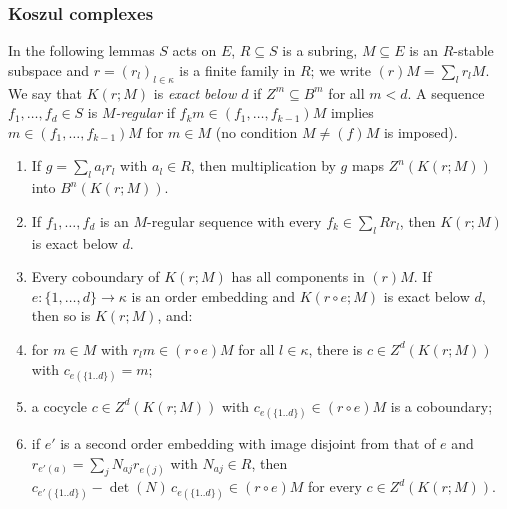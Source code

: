 \subsubsection*{Koszul complexes}
In the following lemmas $S$ acts on $E$, $R\subseteq S$ is a subring, $M\subseteq E$ is an $R$-stable subspace and $r=(r_l)_{l\in\kappa}$ is a
finite family in $R$; we write $(r)M=\sum_lr_lM$. We say that $K(r;M)$ is \emph{exact below $d$} if $Z^m\subseteq B^m$ for all $m<d$. A sequence
$f_1,\dots,f_d\in S$ is \emph{$M$-regular} if $f_km\in(f_1,\dots,f_{k-1})M$ implies $m\in(f_1,\dots,f_{k-1})M$ for $m\in M$ (no
condition $M\ne(f)M$ is imposed).

\begin{lemma}\label{pf:hlf-chart:koszul}
\begin{enumerate}[label=\textup{(\alph*)},nosep]
\item If $g=\sum_la_lr_l$ with $a_l\in R$, then multiplication by $g$ maps $Z^n(K(r;M))$ into $B^n(K(r;M))$.
\item If $f_1,\dots,f_d$ is an $M$-regular sequence with every $f_k\in\sum_lRr_l$, then $K(r;M)$ is exact below $d$.
\item Every coboundary of $K(r;M)$ has all components in $(r)M$. If $e\colon\{1,\dots,d\}\to\kappa$ is an order embedding and $K(r\circ e;M)$ is
  exact below $d$, then so is $K(r;M)$, and:
\item for $m\in M$ with $r_lm\in(r\circ e)M$ for all $l\in\kappa$, there is $c\in Z^d(K(r;M))$ with $c_{e(\{1..d\})}=m$;
\item a cocycle $c\in Z^d(K(r;M))$ with $c_{e(\{1..d\})}\in(r\circ e)M$ is a coboundary;
\item if $e'$ is a second order embedding with image disjoint from that of $e$ and $r_{e'(a)}=\sum_jN_{aj}r_{e(j)}$ with $N_{aj}\in R$, then
  $c_{e'(\{1..d\})}-\det(N)\,c_{e(\{1..d\})}\in(r\circ e)M$ for every $c\in Z^d(K(r;M))$.
\end{enumerate}
\end{lemma}


